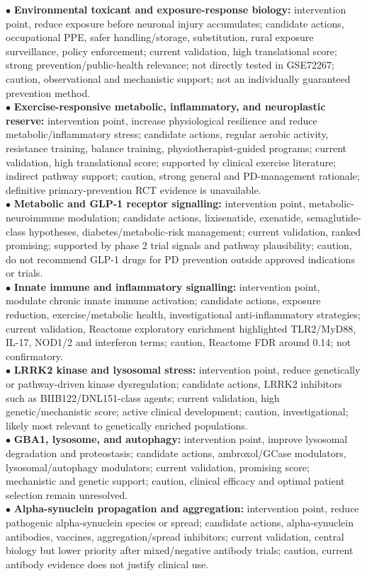 \documentclass{article}
\begin{document}
\noindent $\bullet$ \textbf{Environmental toxicant and exposure-response biology:} intervention point, reduce exposure before neuronal injury accumulates; candidate actions, occupational PPE, safer handling/storage, substitution, rural exposure surveillance, policy enforcement; current validation, high translational score; strong prevention/public-health relevance; not directly tested in GSE72267; caution, observational and mechanistic support; not an individually guaranteed prevention method.\\
\noindent $\bullet$ \textbf{Exercise-responsive metabolic, inflammatory, and neuroplastic reserve:} intervention point, increase physiological resilience and reduce metabolic/inflammatory stress; candidate actions, regular aerobic activity, resistance training, balance training, physiotherapist-guided programs; current validation, high translational score; supported by clinical exercise literature; indirect pathway support; caution, strong general and PD-management rationale; definitive primary-prevention RCT evidence is unavailable.\\
\noindent $\bullet$ \textbf{Metabolic and GLP-1 receptor signalling:} intervention point, metabolic-neuroimmune modulation; candidate actions, lixisenatide, exenatide, semaglutide-class hypotheses, diabetes/metabolic-risk management; current validation, ranked promising; supported by phase 2 trial signals and pathway plausibility; caution, do not recommend GLP-1 drugs for PD prevention outside approved indications or trials.\\
\noindent $\bullet$ \textbf{Innate immune and inflammatory signalling:} intervention point, modulate chronic innate immune activation; candidate actions, exposure reduction, exercise/metabolic health, investigational anti-inflammatory strategies; current validation, Reactome exploratory enrichment highlighted TLR2/MyD88, IL-17, NOD1/2 and interferon terms; caution, Reactome FDR around 0.14; not confirmatory.\\
\noindent $\bullet$ \textbf{LRRK2 kinase and lysosomal stress:} intervention point, reduce genetically or pathway-driven kinase dysregulation; candidate actions, LRRK2 inhibitors such as BIIB122/DNL151-class agents; current validation, high genetic/mechanistic score; active clinical development; caution, investigational; likely most relevant to genetically enriched populations.\\
\noindent $\bullet$ \textbf{GBA1, lysosome, and autophagy:} intervention point, improve lysosomal degradation and proteostasis; candidate actions, ambroxol/GCase modulators, lysosomal/autophagy modulators; current validation, promising score; mechanistic and genetic support; caution, clinical efficacy and optimal patient selection remain unresolved.\\
\noindent $\bullet$ \textbf{Alpha-synuclein propagation and aggregation:} intervention point, reduce pathogenic alpha-synuclein species or spread; candidate actions, alpha-synuclein antibodies, vaccines, aggregation/spread inhibitors; current validation, central biology but lower priority after mixed/negative antibody trials; caution, current antibody evidence does not justify clinical use.\\
\end{document}
